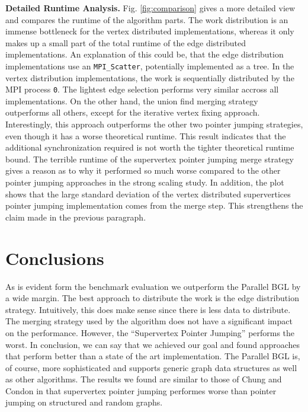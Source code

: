 \documentclass[letterpaper]{article}
\newcommand{\mypar}[1]{{\bf #1.}}
\begin{document}
\mypar{Detailed Runtime Analysis}
Fig. \ref{fig:comparison} gives a more detailed view and compares the runtime of the algorithm parts. The work
distribution is an immense bottleneck for the vertex distributed implementations, whereas it only makes up a small part
of the total runtime of the edge distributed implementations. An explanation of this could be, that the edge
distribution implementations use an \verb|MPI_Scatter|, potentially implemented as a tree. In the vertex distribution
implementations, the work is sequentially distributed by the MPI process \verb|0|. The lightest edge selection performs
very similar accross all implementations. On the other hand, the union find merging strategy outperforms all others,
except for the iterative vertex fixing approach. Interestingly, this approach outperforms the other two pointer jumping
strategies, even though it has a worse theoretical runtime. This result indicates that the additional synchronization
required is not worth the tighter theoretical runtime bound. The terrible runtime of the supervertex pointer jumping
merge strategy gives a reason as to why it performed so much worse compared to the other pointer jumping
approaches in the strong scaling study.
In addition, the plot shows that the large standard deviation of the vertex distributed supervertices pointer jumping
implementation comes from the merge step. This strengthens the claim made in the previous paragraph.

\section{Conclusions}
As is evident form the benchmark evaluation %
we outperform the Parallel BGL by a wide margin. The best approach to distribute the work is the edge distribution
strategy. Intuitively, this does make sense since there is less data to distribute. The merging strategy used by the
algorithm does not have a significant impact on the performance. However, the ``Supervertex Pointer Jumping'' performs
the worst. In conclusion, we can say that we achieved our goal and found approaches that perform better than a state of
the art implementation. The Parallel BGL is, of course, more sophisticated and supports generic graph data structures as
well as other algorithms. The results we found are similar to those of Chung and Condon \cite{chung1996parallel} in that
supervertex pointer jumping performes worse than pointer jumping on structured and random graphs.
\end{document}
